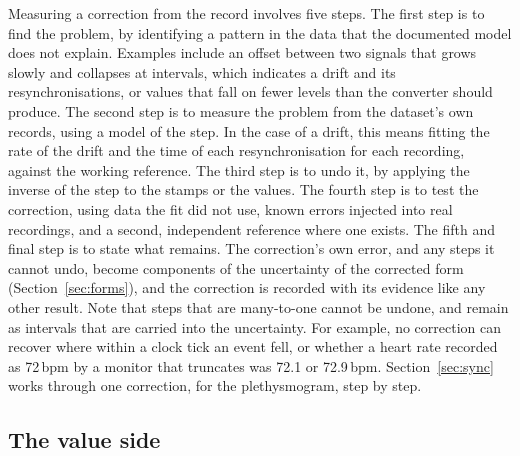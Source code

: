 \documentclass[11pt,a4paper]{article}
\begin{document}
Measuring a correction from the record involves five steps. The first step is to find the problem, by identifying a
pattern in the data that the documented model does not explain. Examples include an offset between two signals that
grows slowly and collapses at intervals, which indicates a drift and its resynchronisations, or values that fall on
fewer levels than the converter should produce. The second step is to measure the problem from the dataset's own
records, using a model of the step. In the case of a drift, this means fitting the rate of the drift and the time of
each resynchronisation for each recording, against the working reference. The third step is to undo it, by applying
the inverse of the step to the stamps or the values. The fourth step is to test the correction, using data the fit did
not use, known errors injected into real recordings, and a second, independent reference where one exists. The fifth
and final step is to state what remains. The correction's own error, and any steps it cannot undo, become components
of the uncertainty of the corrected form (Section~\ref{sec:forms}), and the correction is recorded with its evidence
like any other result. Note that steps that are many-to-one cannot be undone, and remain as intervals that are carried
into the uncertainty. For example, no correction can recover where within a clock tick an event fell, or whether a
heart rate recorded as 72\,bpm by a monitor that truncates was 72.1 or 72.9\,bpm. Section~\ref{sec:sync} works through
one correction, for the plethysmogram, step by step.

\subsection{The value side}
\end{document}
